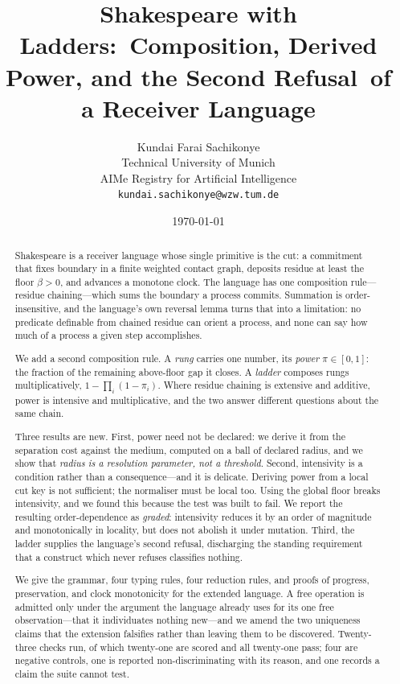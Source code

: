 \documentclass[11pt,twocolumn,a4paper]{article}
\title{\textbf{Shakespeare with Ladders:\
Composition, Derived Power, and the Second Refusal\
of a Receiver Language}}
\author{Kundai Farai Sachikonye\\
\small Technical University of Munich\\
\small AIMe Registry for Artificial Intelligence\\
\small \texttt{kundai.sachikonye@wzw.tum.de}}
\date{\today}
\theoremstyle{plain}
\theoremstyle{definition}
\theoremstyle{remark}
\newcommand{\flo}{\beta}
\newcommand{\pow}{\pi}
\begin{document}
\maketitle

\begin{abstract}
Shakespeare is a receiver language whose single primitive is the cut: a
commitment that fixes boundary in a finite weighted contact graph, deposits
residue at least the floor $\flo>0$, and advances a monotone clock. The
language has one composition rule---residue chaining---which sums the boundary
a process commits. Summation is order-insensitive, and the language's own
reversal lemma turns that into a limitation: no predicate definable from
chained residue can orient a process, and none can say how much of a process a
given step accomplishes.

We add a second composition rule. A \emph{rung} carries one number, its
\emph{power} $\pow\in[0,1]$: the fraction of the remaining above-floor gap it
closes. A \emph{ladder} composes rungs multiplicatively,
$1-\prod_i(1-\pow_i)$. Where residue chaining is extensive and additive, power
is intensive and multiplicative, and the two answer different questions about
the same chain.

Three results are new. First, power need not be declared: we derive it from
the separation cost against the medium, computed on a ball of declared radius,
and we show that \emph{radius is a resolution parameter, not a threshold}.
Second, intensivity is a condition rather than a consequence---and it is
delicate. Deriving power from a local cut key is not sufficient; the
normaliser must be local too. Using the global floor breaks intensivity, and
we found this because the test was built to fail. We report the resulting
order-dependence as \emph{graded}: intensivity reduces it by an order of
magnitude and monotonically in locality, but does not abolish it under
mutation. Third, the ladder supplies the language's second refusal, discharging
the standing requirement that a construct which never refuses classifies
nothing.

We give the grammar, four typing rules, four reduction rules, and proofs of
progress, preservation, and clock monotonicity for the extended language. A
free operation is admitted only under the argument the language already uses
for its one free observation---that it individuates nothing new---and we amend
the two uniqueness claims that the extension falsifies rather than leaving
them to be discovered. Twenty-three checks run, of which
twenty-one are scored and all twenty-one pass; four are negative controls, one
is reported non-discriminating with its reason, and one records a claim the
suite cannot test.
\end{abstract}
\end{document}
